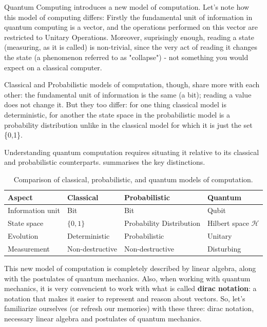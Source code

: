 \documentclass[12pt, a4paper, oneside]{report}
\theoremstyle{plain}
\theoremstyle{definition}
\theoremstyle{remark}
\newcommand{\Hcal}{\mathcal{H}}
\begin{document}
Quantum Computing introduces a new model of computation. Let's note how this model of computing differs: Firstly the fundamental unit of information in quantum computing is a vector, and the operations performed on this vector are restricted to Unitary Operations. Moreover, suprisingly enough, reading a state (measuring, as it is called) is non-trivial, since the very act of reading it changes the state (a phenomenon referred to as "collapse") - not something you would expect on a classical computer.

Classical and Probabilistic models of computation, though, share more with each other: the fundamental unit of information is the same (a bit); reading a value does not change it. But they too differ: for one thing classical model is deterministic, for another the state space in the probabilistic model is a probability distribution unlike in the classical model for which it is just the set \{0,1\}.

Understanding quantum computation requires situating it relative to its classical and
probabilistic counterparts.  summarises the key distinctions.

\begin{table}[h]
	\centering
	\caption{Comparison of classical, probabilistic, and quantum models of computation.}
	\label{tab:models}
	\begin{tabularx}{\linewidth}{lXXX}
		\toprule
		\textbf{Aspect}  & \textbf{Classical} & \textbf{Probabilistic}   & \textbf{Quantum}      \\
		\midrule
		Information unit & Bit                & Bit                      & Qubit                 \\
		State space      & $\{0,1\}$          & Probability Distribution & Hilbert space $\Hcal$ \\
		Evolution        & Deterministic      & Probabilistic            & Unitary               \\
		Measurement      & Non-destructive    & Non-destructive          & Disturbing            \\
		\bottomrule
	\end{tabularx}
\end{table}

This new model of computation is completely described by linear algebra, along with the postulates of quantum mechanics. Also, when working with quantum mechanics, it is very convencient to work with what is called \textbf{dirac notation}: a notation that makes it easier to represent and reason about vectors. So, let's familiarize  ourselves (or refresh our memories) with these three: dirac notation, necessary linear algebra and postulates of quantum mechanics.
\end{document}
